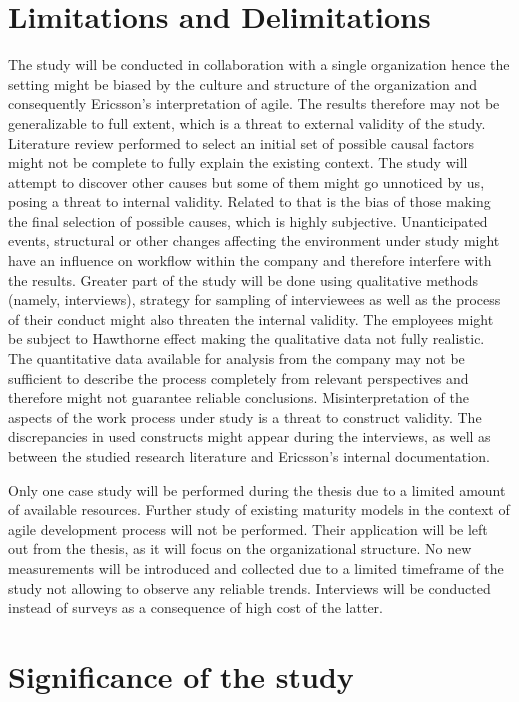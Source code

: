 \documentclass[paper=a4, fontsize=11pt]{scrartcl}
\numberwithin{equation}{section}		%
\numberwithin{figure}{section}			%
\numberwithin{table}{section}			%
\begin{document}
\section{Limitations and Delimitations}

The study will be conducted in collaboration with a single organization hence the setting might be biased by the culture and structure of the organization and consequently Ericsson's interpretation of agile. The results therefore may not be generalizable to full extent, which is a threat to external validity of the study.
Literature review performed to select an initial set of possible causal factors might not be complete to fully explain the existing context. The study will attempt to discover other causes but some of them might go unnoticed by us, posing a threat to internal validity. Related to that is the bias of those making the final selection of possible causes, which is highly subjective. Unanticipated events, structural or other changes affecting the environment under study might have an influence on workflow within the company and therefore interfere with the results. Greater part of the study will be done using qualitative methods (namely, interviews), strategy for sampling of interviewees as well as the process of their conduct might also threaten the internal validity. The employees might be subject to Hawthorne effect making the qualitative data not fully realistic. The quantitative data available for analysis from the company may not be sufficient to describe the process completely from relevant perspectives and therefore might not guarantee reliable conclusions.
Misinterpretation of the aspects of the work process under study is a threat to construct validity. The discrepancies in used constructs might appear during the interviews, as well as between the studied research literature and Ericsson's internal documentation.

Only one case study will be performed during the thesis due to a limited amount of available resources. Further study of existing maturity models in the context of agile development process will not be performed. Their application will be left out from the thesis, as it will focus on the organizational structure. No new measurements will be introduced and collected due to a limited timeframe of the study not allowing to observe any reliable trends. Interviews will be conducted instead of surveys as a consequence of high cost of the latter.

\section{Significance of the study}
\end{document}
